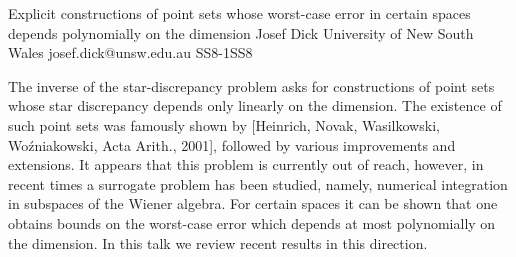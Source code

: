 \begin{talk}
  {Explicit constructions of point sets whose worst-case error in certain spaces depends polynomially on the dimension}%
  {Josef Dick}%
  {University of New South Wales}%
  {josef.dick@unsw.edu.au}%
  {}%
{}{}{SS8-1}{SS8}



The inverse of the star-discrepancy problem asks for constructions of point sets whose star discrepancy depends only linearly on the dimension. The existence of such point sets was famously shown by [Heinrich, Novak, Wasilkowski, Wo\'zniakowski, Acta Arith., 2001], followed by various improvements and extensions. It appears that this problem is currently out of reach, however, in recent times a surrogate problem has been studied, namely, numerical integration in subspaces of the Wiener algebra. For certain spaces it can be shown that one obtains bounds on the worst-case error which depends at most polynomially on the dimension. In this talk we review recent results in this direction.

\end{talk}

